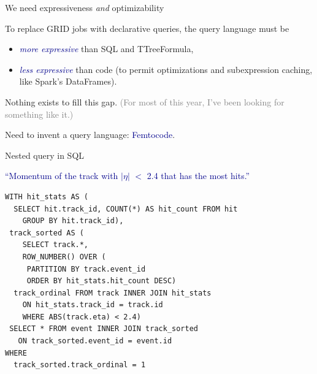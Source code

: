 \documentclass{beamer}
\begin{document}
\begin{frame}{We need expressiveness {\it and} optimizability}
\vspace{0.5 cm}
\begin{center}
\begin{minipage}{0.9\linewidth}
To replace GRID jobs with declarative queries, the query \mbox{language} must be
\begin{itemize}
\item \textcolor{darkblue}{\it more expressive} than SQL and TTreeFormula,
\item \textcolor{darkblue}{\it less expressive} than code (to permit optimizations and subexpression caching, like Spark's DataFrames).
\end{itemize}

\vspace{0.5 cm}
Nothing exists to fill this gap. \textcolor{gray}{(For most of this year, I've been looking for something like it.)}

\vspace{0.5 cm}
Need to invent a query language: \textcolor{darkblue}{Femtocode}.
\end{minipage}
\end{center}
\end{frame}

\begin{frame}[fragile]{Nested query in SQL}
\vspace{0.25 cm}
\begin{center}
\begin{minipage}{0.95\linewidth}
\textcolor{darkblue}{``Momentum of the track with $|\eta|$ $<$ 2.4 that has the most hits.''}
\end{minipage}
\end{center}
\small
\begin{verbatim}
WITH hit_stats AS (
  SELECT hit.track_id, COUNT(*) AS hit_count FROM hit
    GROUP BY hit.track_id),
 track_sorted AS (
    SELECT track.*, 
    ROW_NUMBER() OVER (
     PARTITION BY track.event_id
     ORDER BY hit_stats.hit_count DESC)
  track_ordinal FROM track INNER JOIN hit_stats
    ON hit_stats.track_id = track.id
    WHERE ABS(track.eta) < 2.4)
 SELECT * FROM event INNER JOIN track_sorted
   ON track_sorted.event_id = event.id
WHERE
  track_sorted.track_ordinal = 1
\end{verbatim}
\end{frame}
\end{document}
